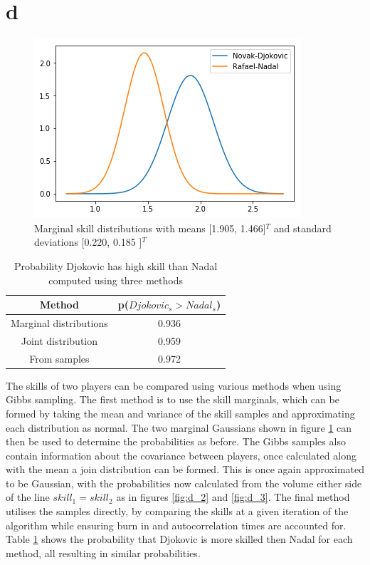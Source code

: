 \documentclass[twoside,twocolumn]{article}
\begin{document}
\section{d}
\begin{figure}[h]
  \centering
    \includegraphics[width=\linewidth]{d_1}
  \caption{Marginal skill distributions with means [1.905, 1.466]$^T$ and standard deviations [0.220, 0.185 ]$^T$ }
  \label{fig:d_1}
\end{figure}

\begin{table}[h]
\centering
\begin{tabular}{ c | c }
Method&p($Djokovic_{s}>Nadal_s$)\\ 

\midrule
Marginal distributions&0.936\\
Joint distribution&0.959\\
From samples&0.972\\
\end{tabular}
\caption{Probability Djokovic has high skill than Nadal computed using three methods }
\label{table:d1}
\end{table}

The skills of two players can be compared using various methods when using Gibbs sampling. The first method is to use the skill marginals, which can be formed by taking the mean and variance of the skill samples and approximating each distribution as normal. The two marginal Gaussians shown in figure \ref{fig:d_1} can then be used to determine the probabilities as before. The Gibbs samples also contain information about the covariance between players, once calculated along with the mean a join distribution can be formed. This is once again approximated to be Gaussian, with the probabilities now calculated from the volume either side of the line $skill_1=skill_2$ as in figures \ref{fig:d_2} and \ref{fig:d_3}. The final method utilises the samples directly, by comparing the skills at a given iteration of the algorithm while ensuring burn in and autocorrelation  times are accounted for. Table \ref{table:d1} shows the probability that Djokovic is more skilled then Nadal for each method, all resulting in similar probabilities.
\end{document}
